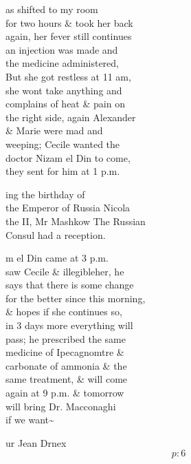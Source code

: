 \documentclass{report}
\begin{document}

	\par{
 	as shifted to my room\ \\for two hours \& took her back\ \\again, her fever still continues\ \\an injection was made and\ \\the medicine administered,\ \\But she got restless at 11 am,\ \\she wont take anything and\ \\complains of heat \& pain on\ \\the right side, again Alexander\ \\\& Marie were mad and\ \\weeping; Cecile wanted the\ \\doctor Nizam el Din to come,\ \\they sent for him at 1 p.m.\ \\
	}

	\par{
 	ing the birthday of\ \\the Emperor of Russia Nicola\ \\the II, Mr Mashkow The Russian\ \\Consul had a reception.\ \\
	}

	\par{
 	m el Din came at 3 p.m.\ \\saw Cecile \& \lbrack illegible\rbrack her, he\ \\says that there is some change\ \\for the better since this morning,\ \\\& hopes if she continues so,\ \\in 3 days more everything will\ \\pass; he prescribed the same\ \\medicine of Ipecagnomtre \&\ \\carbonate of ammonia \& the\ \\same treatment, \& will come\ \\again at 9 p.m. \& tomorrow\ \\will bring Dr. Macconaghi\ \\if we want\~{}\ \\
	}

	\par{
 	ur Jean Drnex\ \\
  \[p: 6 \]

	}
\end{document}
